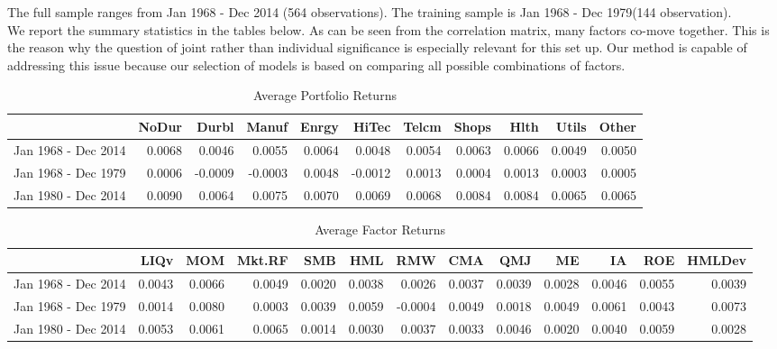The full sample ranges from Jan 1968 - Dec 2014 (564 observations). The training sample is Jan 1968 - Dec 1979(144 observation). \\
We report the summary statistics in the tables below. As can be seen from the correlation matrix, many factors co-move together. This is the reason why the question of joint rather than individual significance is especially relevant for this set up. Our method is capable of addressing this issue because our selection of models is based on comparing all possible combinations of factors.
\begin{table}[ht]
	\footnotesize
	\centering
	\begin{tabular}{rrrrrrrrrrr}
		\hline
		& NoDur & Durbl & Manuf & Enrgy & HiTec & Telcm & Shops & Hlth & Utils & Other \\ 
		\hline
		Jan 1968 - Dec 2014 & 0.0068 & 0.0046 & 0.0055 & 0.0064 & 0.0048 & 0.0054 & 0.0063 & 0.0066 & 0.0049 & 0.0050 \\ 
		Jan 1968 - Dec 1979 & 0.0006 & -0.0009 & -0.0003 & 0.0048 & -0.0012 & 0.0013 & 0.0004 & 0.0013 & 0.0003 & 0.0005 \\ 
			Jan 1980 - Dec 2014 & 0.0090 & 0.0064 & 0.0075 & 0.0070 & 0.0069 & 0.0068 & 0.0084 & 0.0084 & 0.0065 & 0.0065 \\ 
		\hline
	\end{tabular}
		\caption{Average Portfolio Returns}
\end{table}
\begin{table}[ht]
	\scriptsize
	\centering
	\begin{tabular}{rrrrrrrrrrrrr}
		\hline
		& LIQv & MOM & Mkt.RF & SMB & HML & RMW & CMA & QMJ & ME & IA & ROE & HMLDev \\ 
		\hline
		 Jan 1968 - Dec 2014 & 0.0043 & 0.0066 & 0.0049 & 0.0020 & 0.0038 & 0.0026 & 0.0037 & 0.0039 & 0.0028 & 0.0046 & 0.0055 & 0.0039 \\ 
		Jan 1968 - Dec 1979 & 0.0014 & 0.0080 & 0.0003 & 0.0039 & 0.0059 & -0.0004 & 0.0049 & 0.0018 & 0.0049 & 0.0061 & 0.0043 & 0.0073 \\ 
		Jan 1980 - Dec 2014 & 0.0053 & 0.0061 & 0.0065 & 0.0014 & 0.0030 & 0.0037 & 0.0033 & 0.0046 & 0.0020 & 0.0040 & 0.0059 & 0.0028 \\ 
		\hline
	\end{tabular}
	\caption{Average Factor Returns}
\end{table}
